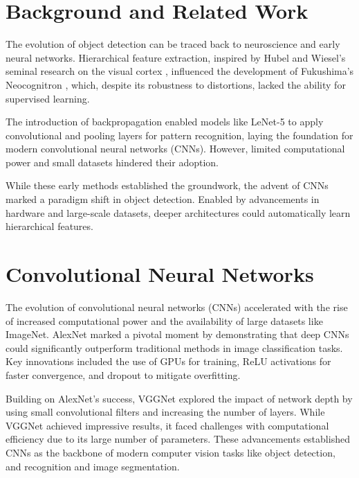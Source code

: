 \documentclass[3p,times]{elsarticle}
\begin{document}
\section{Background and Related Work} \label{background}

The evolution of object detection can be traced back to neuroscience and early neural networks. Hierarchical feature extraction, inspired by Hubel and Wiesel's seminal research on the visual cortex \cite{Hubel1968}, influenced the development of Fukushima's Neocognitron \cite{fukushima:neocognitronbc}, which, despite its robustness to distortions, lacked the ability for supervised learning.
    
The introduction of backpropagation enabled models like LeNet-5 \cite{726791} to apply convolutional and pooling layers for pattern recognition, laying the foundation for modern convolutional neural networks (CNNs). However, limited computational power and small datasets hindered their adoption.

While these early methods established the groundwork, the advent of CNNs marked a paradigm shift in object detection. Enabled by advancements in hardware and large-scale datasets, deeper architectures could automatically learn hierarchical features.

\section{Convolutional Neural Networks} \label{cnn}

The evolution of convolutional neural networks (CNNs) accelerated with the rise of increased computational power and the availability of large datasets like ImageNet. AlexNet \cite{Krizhevsky2012ImageNetCW} marked a pivotal moment by demonstrating that deep CNNs could significantly outperform traditional methods in image classification tasks. Key innovations included the use of GPUs for training, ReLU activations for faster convergence, and dropout to mitigate overfitting.

Building on AlexNet's success, VGGNet \cite{simonyan2015deepconvolutionalnetworkslargescale} explored the impact of network depth by using small convolutional filters and increasing the number of layers. While VGGNet achieved impressive results, it faced challenges with computational efficiency due to its large number of parameters. These advancements established CNNs as the backbone of modern computer vision tasks like object detection, and recognition and image segmentation.
\end{document}
